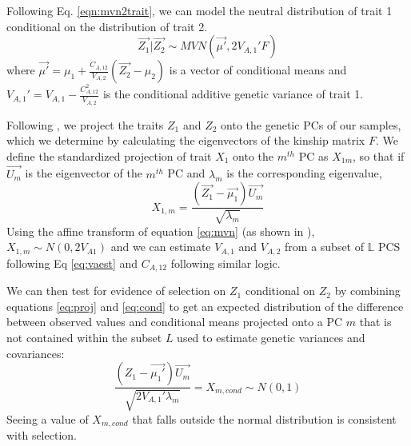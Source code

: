 \documentclass[11pt,letterpaper]{article}
\begin{document}
Following Eq. \ref{eqn:mvn2trait}, we can model the neutral distribution of trait 1 conditional on the distribution of trait 2.
\begin{equation}\label{eq:cond}
\vec{Z_{1}}|\vec{Z_{2}} \sim MVN(\vec{\mu'}, 2V_{A,1}'F)
\end{equation}
where $\vec{\mu'}  = \mu_{1} + \frac{C_{A,12}}{V_{A,2}}(\vec{Z_{2}} - \mu_{2}) $ is a vector of conditional means and $V_{A,1}' =  V_{A,1} - \frac{C_{A,12}^{2}}{V_{A, 2}}$ is the conditional additive genetic variance of trait 1.

Following \cite{Josephs2019}, we project the traits $Z_{1}$ and $Z_{2}$ onto the genetic PCs of our samples, which we determine by calculating the eigenvectors of the kinship matrix $F$.
We define the standardized projection of trait $X_{1}$ onto the $m^{th}$ PC as $X_{1m}$, so that if $\vec{U_m}$ is the eigenvector of the $m^{th}$ PC and $\lambda_{m}$ is the corresponding eigenvalue,
\begin{equation}\label{eq:proj}
X_{1,m} = \frac{(\vec{Z_{1}}-\vec{\mu_{1}})\vec{U_{m}}}{\sqrt{\lambda_{m}}}
  \end{equation}
Using the affine transform of equation \ref{eq:mvn} (as shown in \cite{Josephs2019}), $X_{1,m} \sim N(0, 2V_{A1})$ and we can estimate $V_{A,1}$ and $V_{A,2}$ from a subset of $\mathbb{L}$ PCS following Eq \ref{eq:vaest} and $C_{A,12}$ following similar logic. 

We can then test for evidence of selection on $Z_{1}$ conditional on $Z_{2}$ by combining equations \ref{eq:proj} and \ref{eq:cond} to get an expected distribution of the difference between observed values and conditional means projected onto a PC $m$ that is not contained within the subset $L$ used to estimate genetic variances and covariances:
\begin{equation}
\frac{(Z_{1} - \vec{\mu_{1}'})\vec{U_{m}}}{\sqrt{2V_{A,1}'\lambda_{m}}} = X_{m, cond} \sim N(0,1)
  \end{equation}
Seeing a value of $X_{m,cond}$ that falls outside the normal distribution is consistent with selection. 
\end{document}
